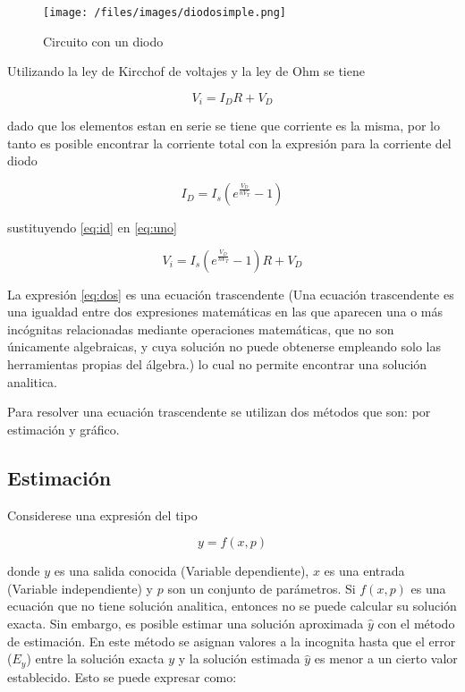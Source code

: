 \documentclass[letterpaper,10pt,english]{/usr/lib/python3.3/site-packages/sphinx/texinputs/sphinxhowto}
\begin{document}
\begin{figure}[htbp]
\centering
\texttt{[image: /files/images/diodosimple.png]}
\caption{Circuito con un diodo}
\end{figure}

Utilizando la ley de Kircchof de voltajes y la ley de Ohm se tiene

\begin{equation}\label{eq:uno}
V_{i}=I_{D}R+V_{D}
\end{equation}

dado que los elementos estan en serie se tiene que corriente es la
misma, por lo tanto es posible encontrar la corriente total con la
expresión para la corriente del diodo

\begin{equation}\label{eq:id}
I_{D}=I_{s}\left( e^{\frac{V_{D}}{nV_{T}}}-1\right)
\end{equation}

sustituyendo \eqref{eq:id} en \eqref{eq:uno}

\begin{equation}\label{eq:dos}
V_{i}=I_{s}\left( e^{\frac{V_{D}}{nV_{T}}}-1\right)R+V_{D}
\end{equation}

La expresión \eqref{eq:dos} es una ecuación trascendente (Una ecuación
trascendente es una igualdad entre dos expresiones matemáticas en las
que aparecen una o más incógnitas relacionadas mediante operaciones
matemáticas, que no son únicamente algebraicas, y cuya solución no puede
obtenerse empleando solo las herramientas propias del álgebra.) lo cual
no permite encontrar una solución analitica.

Para resolver una ecuación trascendente se utilizan dos métodos que son:
por estimación y gráfico.

\subsection{Estimación}

Considerese una expresión del tipo

\begin{equation}\label{eq:idea1}
y=f(x,p)
\end{equation}

donde $y$ es una salida conocida (Variable dependiente), $x$ es una
entrada (Variable independiente) y $p$ son un conjunto de parámetros. Si
$f(x,p)$ es una ecuación que no tiene solución analitica, entonces no se
puede calcular su solución exacta. Sin embargo, es posible estimar una
solución aproximada $\hat{y}$ con el método de estimación. En este
método se asignan valores a la incognita hasta que el error ($E_{y}$)
entre la solución exacta $y$ y la solución estimada $\hat{y}$ es menor a
un cierto valor establecido. Esto se puede expresar como:
\end{document}

